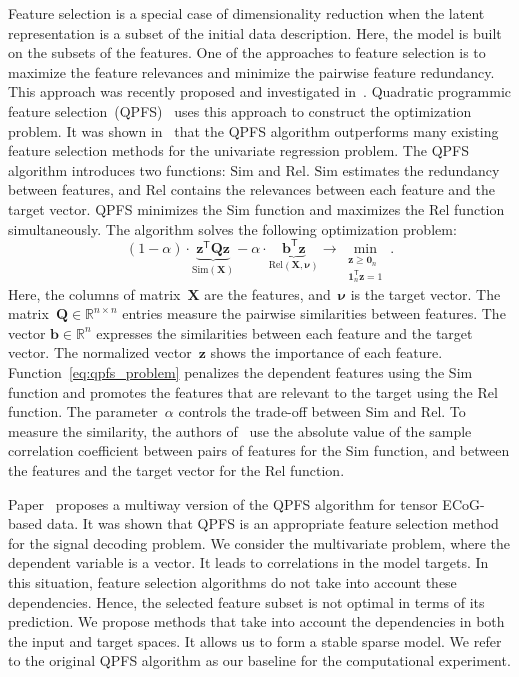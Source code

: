 \documentclass[preprint,12pt]{elsarticle}
\theoremstyle{definition}
\newcommand{\bz}{\mathbf{z}}
\newcommand{\bb}{\mathbf{b}}
\newcommand{\bX}{\mathbf{X}}
\newcommand{\bQ}{\mathbf{Q}}
\newcommand{\bbR}{\mathbb{R}}
\newcommand{\T}{\mathsf{T}}
\newcommand{\bnu}{\boldsymbol{\nu}}
\newcommand{\bOne}{\boldsymbol{1}}
\newcommand{\bZero}{\boldsymbol{0}}
\begin{document}
Feature selection is a special case of dimensionality reduction when the latent representation is a subset of the initial data description. 
Here, the model is built on the subsets of the features. 
One of the approaches to feature selection is to maximize the feature relevances and minimize the pairwise feature redundancy. 
This approach was recently proposed and investigated in~\cite{ding2005minimum,yamada2014high}.
Quadratic programmic feature selection~(QPFS)~\cite{rodriguez2010quadratic} uses this approach to construct the optimization problem. It was shown in~\cite{katrutsa2017comprehensive} that the QPFS algorithm outperforms many existing feature selection methods for the univariate regression problem. 
The QPFS algorithm introduces two functions: $\text{Sim}$ and $\text{Rel}$.
$\text{Sim}$ estimates the redundancy between features, and $\text{Rel}$ contains the relevances between each feature and the target vector.
QPFS minimizes the Sim function and maximizes the Rel function simultaneously.
The algorithm solves the following optimization problem:
\begin{equation}
(1 - \alpha) \cdot \underbrace{\bz^{\T} \bQ \bz}_{\text{Sim}(\bX)} - \alpha \cdot \underbrace{ \bb^{\T} \bz}_{\text{Rel} (\bX, \bnu)} \rightarrow \min_{\substack{\bz \geq \bZero_n \\ \bOne_n^{\T} \bz=1}}.
\label{eq:qpfs_problem}
\end{equation}
Here, the columns of matrix~$\bX$ are the features, and~$\bnu$ is the target vector. 
The matrix~$\bQ \in \bbR^{n \times n}$ entries measure the pairwise similarities between features.
The vector $\bb \in \bbR^n$ expresses the similarities between each feature and the target vector.
The normalized vector~$\bz$ shows the importance of each feature.
Function~\eqref{eq:qpfs_problem} penalizes the dependent features using the Sim function and promotes the features that are relevant to the target using the Rel function.
The parameter~$\alpha$ controls the trade-off between Sim and Rel.
To measure the similarity, the authors of~\cite{rodriguez2010quadratic} use the absolute value of the sample correlation coefficient between pairs of features for the Sim function, and between the features and the target vector for the Rel function.

Paper~\cite{motrenko2018multi} proposes a multiway version of the QPFS algorithm for tensor ECoG-based data. 
It was shown that QPFS is an appropriate feature selection method for the signal decoding problem.
We consider the multivariate problem, where the dependent variable is a vector. 
It leads to correlations in the model targets. 
In this situation, feature selection algorithms do not take into account these dependencies.
Hence, the selected feature subset is not optimal in terms of its prediction.
We propose methods that take into account the dependencies in both the input and target spaces. 
It allows us to form a stable sparse model.
We refer to the original QPFS algorithm as our baseline for the computational experiment.
\end{document}
